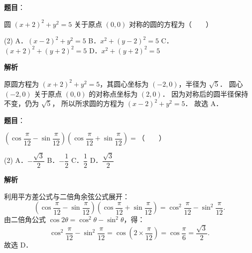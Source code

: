 
\begin{answer}

\textbf{题目}：

圆 $(x + 2)^2 + y^2 = 5$ 关于原点 $(0, 0)$ 对称的圆的方程为\mbox{（　　）}

\begin{gkopts}(2)
\task A．$(x - 2)^2 + y^2 = 5$
\task B．$x^2 + (y - 2)^2 = 5$
\task C．$(x + 2)^2 + (y + 2)^2 = 5$
\task D．$x^2 + (y + 2)^2 = 5$
\end{gkopts}

\textbf{解析}

原圆方程为 $(x + 2)^2 + y^2 = 5$，其圆心坐标为 $(-2, 0)$，半径为 $\sqrt{5}$．
圆心 $(-2, 0)$ 关于原点 $(0, 0)$ 的对称点坐标为 $(2, 0)$．
因为对称后的圆半径保持不变，仍为 $\sqrt{5}$，
所以所求圆的方程为 $(x - 2)^2 + y^2 = 5$．
故选 A．


\end{answer}
\begin{answer}

\textbf{题目}：

$\left(\cos\dfrac{\pi}{12} - \sin\dfrac{\pi}{12}\right)\left(\cos\dfrac{\pi}{12} + \sin\dfrac{\pi}{12}\right) =$\mbox{（　　）}

\begin{gkopts}(2)
\task A．$-\dfrac{\sqrt{3}}{2}$
\task B．$-\dfrac{1}{2}$
\task C．$\dfrac{1}{2}$
\task D．$\dfrac{\sqrt{3}}{2}$
\end{gkopts}

\textbf{解析}

利用平方差公式与二倍角余弦公式展开：
\nopagebreak[4]
\[
\left(\cos\frac{\pi}{12} - \sin\frac{\pi}{12}\right)\left(\cos\frac{\pi}{12} + \sin\frac{\pi}{12}\right) = \cos^2\frac{\pi}{12} - \sin^2\frac{\pi}{12}.
\]
由二倍角公式 $\cos 2\theta = \cos^2\theta - \sin^2\theta$，得：
\nopagebreak[4]
\[
\cos^2\frac{\pi}{12} - \sin^2\frac{\pi}{12} = \cos\left(2 \times \frac{\pi}{12}\right) = \cos\frac{\pi}{6} = \frac{\sqrt{3}}{2}.
\]
故选 D．


\end{answer}
